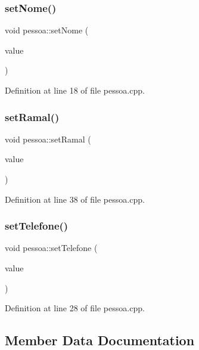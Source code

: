 \subsubsection{\texorpdfstring{set\+Nome()}{setNome()}}
{\footnotesize\ttfamily void pessoa\+::set\+Nome (\begin{DoxyParamCaption}\item[{const Q\+String \&}]{value }\end{DoxyParamCaption})}



Definition at line 18 of file pessoa.\+cpp.

\hypertarget{classpessoa_a4e6fa1b22e8824e270fd2aee4c9866e7}{}\label{classpessoa_a4e6fa1b22e8824e270fd2aee4c9866e7} 
\subsubsection{\texorpdfstring{set\+Ramal()}{setRamal()}}
{\footnotesize\ttfamily void pessoa\+::set\+Ramal (\begin{DoxyParamCaption}\item[{int}]{value }\end{DoxyParamCaption})}



Definition at line 38 of file pessoa.\+cpp.

\hypertarget{classpessoa_a6c7b481abf0bc292e5ff28367f5e7512}{}\label{classpessoa_a6c7b481abf0bc292e5ff28367f5e7512} 
\subsubsection{\texorpdfstring{set\+Telefone()}{setTelefone()}}
{\footnotesize\ttfamily void pessoa\+::set\+Telefone (\begin{DoxyParamCaption}\item[{const Q\+String \&}]{value }\end{DoxyParamCaption})}



Definition at line 28 of file pessoa.\+cpp.



\subsection{Member Data Documentation}
\hypertarget{classpessoa_af788a2b8720c8368236afc3875a9fb75}{}\label{classpessoa_af788a2b8720c8368236afc3875a9fb75} 
